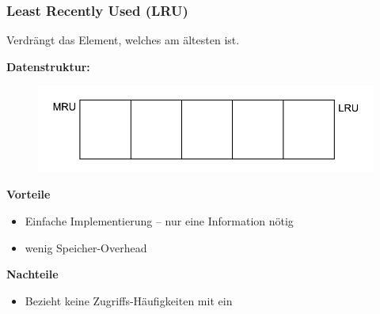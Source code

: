\documentclass[presentation]{beamer}
\begin{document}
\begin{frame}
\frametitle{Least Recently Used (LRU)}
Verdrängt das Element, welches am ältesten ist. \\
\vspace{0.3cm}

\color{dd-gray} \textbf{Datenstruktur:} \color{black} 
\begin{figure}
	\includegraphics[width=0.6\linewidth]{figures/caches/lru}
\end{figure} 
\baselineskip%
%	
\color{dd-gray} \textbf{Vorteile} \color{black} 
\begin{itemize}%
	\item Einfache Implementierung -- nur eine Information nötig %
	\item wenig Speicher-Overhead
\end{itemize}

\color{dd-gray} \textbf{Nachteile} \color{black} 
\begin{itemize}%
	\item Bezieht keine Zugriffs-Häufigkeiten mit ein
\end{itemize}
\end{frame}
\end{document}
